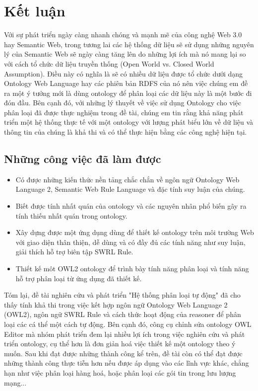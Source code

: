 \chapter{Kết luận}
Với sự phát triển ngày càng nhanh chóng và mạnh mẽ của công nghệ Web 3.0 hay Semantic Web, trong tương lai các hệ thống dữ liệu sẽ sử dụng những nguyên lý của Semantic Web sẽ ngày càng tăng lên do những lợi ích mà nó mang lại so với cách tổ chức dữ liệu truyền thống (Open World vs. Closed World Assumption). Điều này có nghĩa là sẽ có nhiều dữ liệu được tổ chức dưới dạng Ontology Web Language hay các phiên bản RDFS của nó nên việc chúng em đề ra một ý tưởng mới là dùng ontology để phân loại các dữ liệu này là một bước đi đón đầu. Bên cạnh đó, với những lý thuyết về việc sử dụng Ontology cho việc phân loại đã được thực nghiệm trong đề tài, chúng em tin rằng khả năng phát triển một hệ thống thực tế với một ontology với lượng phát biểu lớn về dữ liệu và thông tin của chúng là khả thi và có thể thực hiện bằng các công nghệ hiện tại.
\section{Những công việc đã làm được}
\begin{itemize}
\item Có được những kiến thức nền tảng chắc chắn về ngôn ngữ Ontology Web Language 2, Semantic Web Rule Language và đặc tính suy luận của chúng.
\item Biết được tính nhất quán của ontology  và các nguyên nhân phổ biến gây ra tính thiếu nhất quán trong ontology.
\item Xây dựng được một ứng dụng dùng để thiết kế ontology trên môi trường Web với giao diện thân thiện, dễ dùng và có đầy đủ các tính năng như suy luận, giải thích hỗ trợ biên tập SWRL Rule.
\item Thiết kế môt OWL2 ontology để trình bày tính năng phân loại và tính năng hỗ trợ phân loại từ ứng dụng đã thiết kế.
\end{itemize}
Tóm lại, đề tài nghiên cứu và phát triển "Hệ thống phân loại tự động" đã cho thấy tính khả thi trong việc kết hợp ngôn ngữ Ontology Web Language 2 (OWL2), ngôn ngữ SWRL Rule và cách thức hoạt động của reasoner để phân loại các cá thể một cách tự động. Bên cạnh đó, công cụ chỉnh sửa ontology OWL Editor mà nhóm phát triển đem lại nhiều lợi ích trong việc nghiên cứu và phát triển ontology, cụ thể hơn là đơn giản hoá việc thiết kế một ontology theo ý muốn. Sau khi đạt được những thành công kể trên, đề tài còn có thể đạt được những thành công thực tiễn hơn nếu được áp dụng vào các lĩnh vực khác, chẳng hạn như việc phân loại hàng hoá, hoặc phân loại các gói tin trong lưu lượng mạng...
